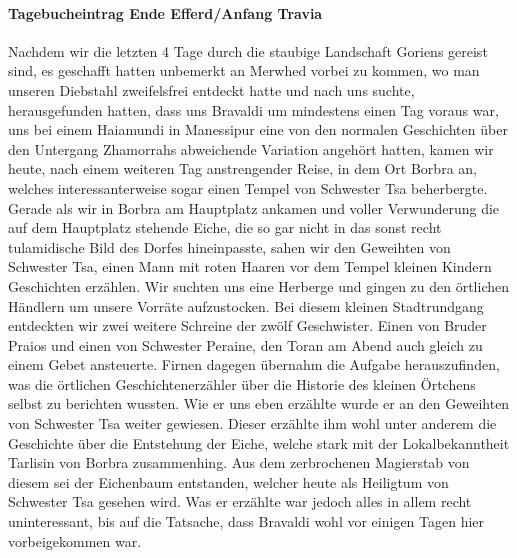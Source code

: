 \paragraph{Tagebucheintrag Ende Efferd/Anfang Travia}
Nachdem wir die letzten 4 Tage durch die staubige Landschaft Goriens gereist sind, es geschafft hatten unbemerkt an Merwhed vorbei zu kommen, wo man unseren Diebstahl zweifelsfrei entdeckt hatte und nach uns suchte, herausgefunden hatten, dass uns Bravaldi um mindestens einen Tag voraus war, uns bei einem Haiamundi in Manessipur eine von den normalen Geschichten über den Untergang Zhamorrahs abweichende Variation angehört hatten, kamen wir heute, nach einem weiteren Tag anstrengender Reise, in dem Ort Borbra an, welches interessanterweise sogar einen Tempel von Schwester Tsa beherbergte. Gerade als wir in Borbra am Hauptplatz ankamen und voller Verwunderung die auf dem Hauptplatz stehende Eiche, die so gar nicht in das sonst recht tulamidische Bild des Dorfes hineinpasste, sahen wir den Geweihten von Schwester Tsa, einen Mann mit roten Haaren vor dem Tempel kleinen Kindern Geschichten erzählen. Wir suchten uns eine Herberge und gingen zu den örtlichen Händlern um unsere Vorräte aufzustocken. Bei diesem kleinen Stadtrundgang entdeckten wir zwei weitere Schreine der zwölf Geschwister. Einen von Bruder Praios und einen von Schwester Peraine, den Toran am Abend auch gleich zu einem Gebet ansteuerte. Firnen dagegen übernahm die Aufgabe herauszufinden, was die örtlichen Geschichtenerzähler über die Historie des kleinen Örtchens selbst zu berichten wussten. Wie er uns eben erzählte wurde er an den Geweihten von Schwester Tsa weiter gewiesen. Dieser erzählte ihm wohl unter anderem die Geschichte über die Entstehung der Eiche, welche stark mit der Lokalbekanntheit Tarlisin von Borbra zusammenhing. Aus dem zerbrochenen Magierstab von diesem sei der Eichenbaum entstanden, welcher heute als Heiligtum von Schwester Tsa gesehen wird. Was er erzählte war jedoch alles in allem recht uninteressant, bis auf die Tatsache, dass Bravaldi wohl vor einigen Tagen hier vorbeigekommen war.

